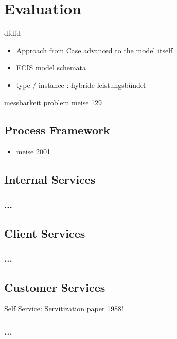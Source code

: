
\chapter{Evaluation}
dfdfd
\begin{itemize}
	\item Approach from Case advanced to the model itself
	\item ECIS model schemata
	\item type / instance : hybride leistungsbündel
\end{itemize}

messbarkeit problem meise 129

	\section{Process Framework}
	\begin{itemize}
		\item meise 2001
	\end{itemize}
	\section{Internal Services}
	\subsection{...}
	\section{Client Services}
	\subsection{...}
	\section{Customer Services}
	Self Service: Servitization paper 1988!
	\subsection{...}
